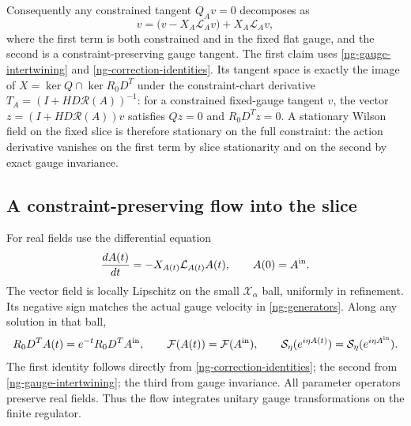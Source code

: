 Consequently any constrained tangent $Q_Av=0$ decomposes as
\begin{equation}\label{ng-tangent-decomposition}
 v=\bigl(v-X_A\mathcal L_Av\bigr)+X_A\mathcal L_Av,
\end{equation}
where the first term is both constrained and in the fixed flat
gauge, and the second is a constraint-preserving gauge tangent.
The first claim uses \eqref{ng-gauge-intertwining} and
\eqref{ng-correction-identities}. Its tangent space is exactly the
image of $X=\ker Q\cap\ker R_0D^T$ under the constraint-chart
derivative $T_A=(I+H D\mathcal R(A))^{-1}$: for a constrained
fixed-gauge tangent $v$, the vector
$z=(I+H D\mathcal R(A))v$ satisfies $Qz=0$ and $R_0D^Tz=0$.
A stationary Wilson field on
the fixed slice is therefore stationary on the full constraint:
the action derivative vanishes on the first term by slice
stationarity and on the second by exact gauge invariance.

\subsection{A constraint-preserving flow into the slice}

For real fields use the differential equation
\begin{equation}\label{ng-flow}
 \frac{dA(t)}{dt}=-X_{A(t)}\mathcal L_{A(t)}A(t),
 \qquad A(0)=A^{\rm in}.
\end{equation}
The vector field is locally Lipschitz on the small
$\mathcal X_\alpha$ ball, uniformly in refinement. Its negative
sign matches the actual gauge velocity in
\eqref{ng-generators}. Along any solution in that ball,
\begin{equation}\label{ng-flow-identities}
 R_0D^TA(t)=e^{-t}R_0D^TA^{\rm in},\qquad
 \mathcal F(A(t))=\mathcal F(A^{\rm in}),\qquad
 \mathcal S_\eta(e^{i\eta A(t)})
             =\mathcal S_\eta(e^{i\eta A^{\rm in}}).
\end{equation}
The first identity follows directly from
\eqref{ng-correction-identities}; the second from
\eqref{ng-gauge-intertwining}; the third from gauge invariance.
All parameter operators preserve real fields. Thus the flow
integrates unitary gauge transformations on the finite regulator.

